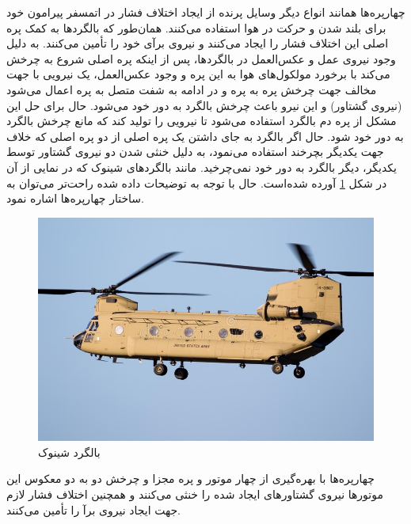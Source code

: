 چهارپره‌ها همانند انواع دیگر وسایل پرنده از ایجاد اختلاف فشار در اتمسفر پیرامون خود برای بلند شدن و حرکت در هوا استفاده می‌کنند. همان‌طور که بالگرد‌ها به کمک پره اصلی این اختلاف فشار را ایجاد می‌کنند و نیروی برآی خود را تأمین می‌کنند. به دلیل وجود نیروی عمل و عکس‌العمل در بالگردها، پس از اینکه پره اصلی شروع به چرخش می‌کند با برخورد مولکول‌های هوا به این پره و وجود عکس‌العمل، یک نیرویی با جهت مخالف جهت چرخش پره به پره و در ادامه به شفت متصل به پره اعمال می‌شود (نیروی گشتاور) و این نیرو باعث چرخش بالگرد به دور خود می‌شود. حال برای حل این مشکل از پره دم بالگرد استفاده می‌شود تا نیرویی را تولید کند که مانع چرخش بالگرد به دور خود شود. حال اگر بالگرد به جای داشتن یک پره اصلی از دو پره اصلی که خلاف جهت یکدیگر بچرخند استفاده می‌نمود، به دلیل خنثی شدن دو نیروی گشتاور توسط یکدیگر، دیگر بالگرد به دور خود نمی‌چرخید. مانند بالگردهای شینوک که در نمایی از آن در شکل
\ref{chinook}
  آورده شده‌است. حال با توجه به توضیحات داده شده راحت‌تر می‌توان به ساختار چهارپره‌ها اشاره نمود.
\begin{figure}[H]
	\includegraphics[width=12cm]{figs/introduction/boeing-ch-chinook.jpg}
	\centering
	\caption{بالگرد شینوک
		\cite{CH-47}}
	\label{chinook}
\end{figure}


چهارپره‌ها با بهره‌گیری از چهار موتور و پره مجزا و چرخش دو به دو معکوس این موتورها نیروی گشتاورهای ایجاد شده را خنثی می‌کنند و همچنین اختلاف فشار لازم جهت ایجاد نیروی برآ را تأمین می‌کنند.

